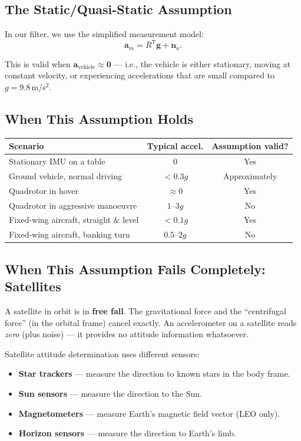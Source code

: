 \documentclass[11pt,letterpaper]{article}
\begin{document}
\subsection{The Static/Quasi-Static Assumption}

In our filter, we use the simplified measurement model:
\[
  \mathbf{a}_m = R^{\mathsf{T}} \mathbf{g} + \mathbf{n}_{a}.
\]

This is valid when $\mathbf{a}_{\mathrm{vehicle}} \approx \mathbf{0}$
--- i.e., the vehicle is either stationary, moving at constant
velocity, or experiencing accelerations that are small compared to
$g = 9.8$\,m/s$^{2}$.

\subsection{When This Assumption Holds}

\begin{center}
\begin{tabular}{lcc}
\toprule
\textbf{Scenario} & \textbf{Typical accel.} &
  \textbf{Assumption valid?} \\
\midrule
Stationary IMU on a table & $0$ & Yes \\
Ground vehicle, normal driving & $< 0.3g$ & Approximately \\
Quadrotor in hover & $\approx 0$ & Yes \\
Quadrotor in aggressive manoeuvre & $1$--$3g$ & No \\
Fixed-wing aircraft, straight \& level & $< 0.1g$ & Yes \\
Fixed-wing aircraft, banking turn & $0.5$--$2g$ & No \\
\bottomrule
\end{tabular}
\end{center}

\subsection{When This Assumption Fails Completely: Satellites}

A satellite in orbit is in \textbf{free fall}.  The gravitational
force and the ``centrifugal force'' (in the orbital frame) cancel
exactly.  An accelerometer on a satellite reads \emph{zero} (plus
noise) --- it provides no attitude information whatsoever.

Satellite attitude determination uses different sensors:
\begin{itemize}[nosep]
  \item \textbf{Star trackers} --- measure the direction to known
    stars in the body frame.
  \item \textbf{Sun sensors} --- measure the direction to the Sun.
  \item \textbf{Magnetometers} --- measure Earth's magnetic field
    vector (LEO only).
  \item \textbf{Horizon sensors} --- measure the direction to
    Earth's limb.
\end{itemize}
\end{document}
